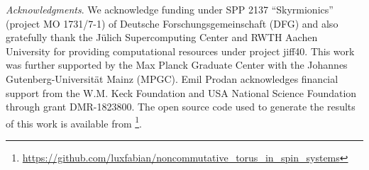 \documentclass[
    10pt,
    aps,
    prr,
    twocolumn,
    floatfix,
    superscriptaddress
]{revtex4-2}
\newcommand{\revise}[1]{{\color{red} #1}}
\begin{document}
\revise{{\it Acknowledgments}}. 
We  acknowledge  funding  under SPP 2137 ``Skyrmionics'' (project  MO  1731/7-1)  of  Deutsche  Forschungsgemeinschaft (DFG) and also gratefully thank the J\"ulich Supercomputing Center and RWTH Aachen University for providing computational resources under project jiff40. 
This work was further supported by the Max Planck Graduate Center with the Johannes Gutenberg-Universit\"at Mainz (MPGC).
Emil Prodan acknowledges financial support from the W.M. Keck Foundation and USA National Science Foundation through grant  DMR-1823800.
The open source code used to generate the results of this work is available from \footnote{\url{https://github.com/luxfabian/noncommutative_torus_in_spin_systems}}.



  
\end{document}
